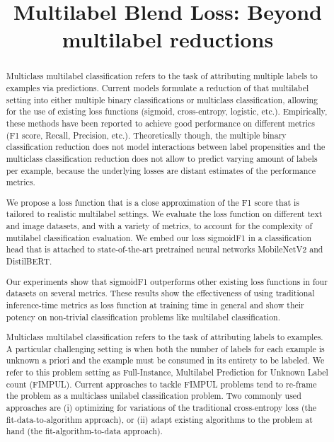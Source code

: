 \documentclass[sigconf,natbib,screen=true,review=true,anonymous]{acmart}
\begin{document}
\title[Multilabel Blend Loss: Beyond multilabel reductions]{Multilabel Blend Loss: Beyond multilabel reductions}


\begin{abstract}

  Multiclass multilabel classification refers to the task of attributing multiple labels to examples via predictions. Current models formulate a reduction of that multilabel setting into either multiple binary classifications or multiclass classification, allowing for the use of existing loss functions (sigmoid, cross-entropy, logistic, etc.). Empirically, these methods have been reported to achieve good performance on different metrics (F1 score, Recall, Precision, etc.). Theoretically though, the multiple binary classification reduction does not model interactions between label propensities and the multiclass classification reduction does not allow to predict varying amount of labels per example, because the underlying losses are distant estimates of the performance metrics.

  We propose a loss function that is a close approximation of the F1 score that is tailored to realistic multilabel settings.  We evaluate the loss function on different text and image datasets, and with a variety of metrics, to account for the complexity of mutilabel classification evaluation. We embed our loss sigmoidF1 in a classification head that is attached to state-of-the-art pretrained neural networks MobileNetV2 and DistilBERT.

Our experiments show that sigmoidF1 outperforms other existing loss functions in four datasets on several metrics. These results show the effectiveness of using traditional inference-time metrics as loss function at training time in general and show their potency on non-trivial classification problems like multilabel classification.
  

Multiclass multilabel classification refers to the task of attributing labels to examples. A particular challenging setting is when both the number of labels for each example is unknown a priori and the example must be consumed in its entirety to be labeled. We refer to this problem setting as Full-Instance, Multilabel Prediction for Unknown Label count (FIMPUL). Current approaches to tackle FIMPUL problems tend to re-frame the problem as a multiclass unilabel classification problem. Two commonly used approaches are (i) optimizing for variations of the traditional cross-entropy loss (the fit-data-to-algorithm approach), or (ii) adapt existing algorithms to the problem at hand (the fit-algorithm-to-data approach).


\end{abstract}
\end{document}
